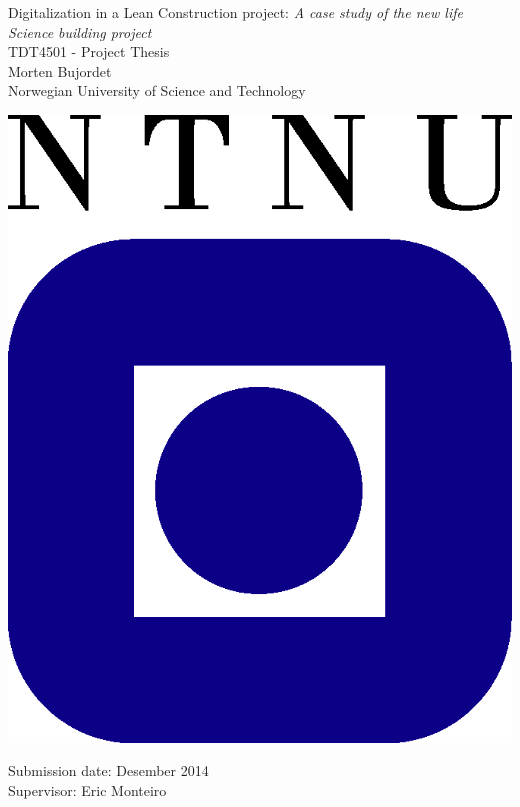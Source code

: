 \begin{titlepage}
    \begin{center}
    
        {\Huge Digitalization in a Lean Construction project: \textit{A case study of the new life Science building project}} \\[0.4cm]
    
        {\Large TDT4501 - Project Thesis} \\[2.0cm]
        {\Large Morten Bujordet} \\ [0.5cm]
        {\Large Norwegian University of Science and Technology}\\
    
        \vspace{3.0cm}
    
                \includegraphics{fig/ntnu-logo2.png}
    
        \vspace{3.0cm}
    
        {\Large Submission date: Desember 2014} \\[0.2cm]
        {\Large Supervisor: Eric Monteiro} \\ [0.2cm]
    \end{center}
\end{titlepage}